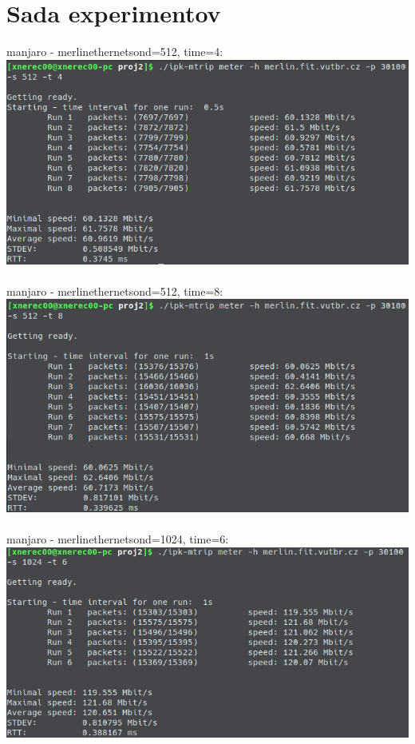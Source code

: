 \documentclass[a4paper, 11pt]{article}
\begin{document}
\section{Sada experimentov}
manjaro - merlin\qquad ethernet\qquad sond=512, time=4:\\
\includegraphics[scale=0.5]{pic/loc1.png}\\\\
manjaro - merlin\qquad ethernet\qquad sond=512, time=8:\\
\includegraphics[scale=0.5]{pic/loc2.png}\\\\
manjaro - merlin\qquad ethernet\qquad sond=1024, time=6:\\
\includegraphics[scale=0.5]{pic/loc3.png}\\\\
\end{document}
